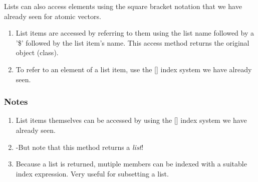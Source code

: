 \documentclass[titlepage]{book}\usepackage{knitr}
\begin{document}
Lists can also access elements using the square bracket notation that we have already seen for atomic vectors.

\begin{knitrout}
\color{fgcolor}\begin{kframe}
\begin{alltt}
\hlopt{$}                   
\hlopt{$}\hlstd{c2[}\hlstd{]}                       
\end{alltt}
\end{kframe}
\end{knitrout}
\begin{enumerate}

\item{List items are accessed by referring to them using the list name followed by a '\$' followed by the list item's  name. This access method returns the original object (class).}
\item{To refer to an element of a list item, use the [] index system we have already seen.}
\end{enumerate}

\begin{knitrout}
\color{fgcolor}\begin{kframe}
\begin{alltt}
\hlstd{l1[}\hlstd{]}                          
\hlstd{(l1[}\hlstd{])}                   
\hlstd{l1[}\hlopt{:}\hlstd{]}                        
\hlstd{(l1[}\hlopt{:}\hlstd{])}
\end{alltt}
\end{kframe}
\end{knitrout}
  \subsubsection{Notes}
\begin{enumerate}

\item{List items themselves can be accessed by using the [] index system we have already seen.}
\item{ -But note that this method returns a \emph{list}!}
\item{ Because a list is returned, mutiple members can be indexed with a suitable index expression.  Very  useful for subsetting a list.}
\end{enumerate}
\end{document}
